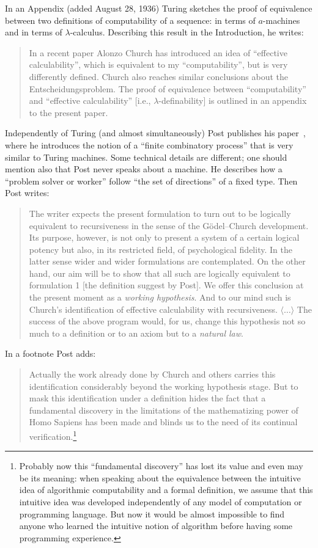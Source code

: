 \documentclass[12pt]{article}
\theoremstyle{remark}
\newcommand*{\gl}{\nobreak\hskip1pt}
\DeclareRobustCommand*{\endash}{\gl\hbox{--}\gl}
\begin{document}
In an Appendix (added August 28, 1936) Turing sketches the proof of equivalence between two definitions of computability of a sequence: in terms of $a$-machines and in terms of $\lambda$-calculus. Describing this result in the Introduction, he writes:
\begin{quote}
In a recent paper Alonzo Church has introduced an idea of ``effective calculability'', which is equivalent to my ``computability'', but is very differently defined. Church also reaches similar conclusions about the Entscheidungsproblem. The proof of equivalence between ``computability'' and ``effective calculability'' [i.e., $\lambda$-definability] is outlined in an appendix to the present paper.
\end{quote}

Independently of Turing (and almost simultaneously) Post publishes his paper~\cite{Post1936}, where he introduces the notion of a ``finite combinatory process'' that is very similar to Turing machines. Some technical details are different; one should mention also that Post never speaks about a machine. He describes how a ``problem solver or worker'' follow ``the set of directions'' of a fixed type. Then Post writes: 
%
\begin{quote}
The writer expects the present formulation to turn out to be logically equivalent to recursiveness in the sense of the G\"{o}del\endash Church development. Its purpose, however, is not only to present a system of a certain logical potency but also, in its restricted field, of psychological fidelity. In the latter sense wider and wider formulations are contemplated. On the other hand, our aim will be to show that all such are logically equivalent to formulation 1 [the definition suggest by Post]. We offer this conclusion at the present moment as a \emph{working hypothesis}. And to our mind such is Church's identification of effective calculability with recursiveness. $\langle\ldots\rangle$ The success of the above program would, for us, change this hypothesis not so much to a definition or to an axiom but to a \emph{natural law}. 
\end{quote}
In a footnote Post adds:
\begin{quote}
Actually the work already done by Church and others carries this identification considerably beyond the working hypothesis stage. But to mask this identification under a definition hides the fact that a fundamental discovery in the limitations of the mathematizing power of Homo Sapiens has been made and blinds us to the need of its continual verification.\footnote{%
Probably now this ``fundamental discovery'' has lost its value and even may be its meaning: when speaking about the equivalence between the intuitive idea of algorithmic computability and a formal definition, we assume that this intuitive idea was developed independently of any model of computation or programming language. But now it would be almost impossible to find anyone who learned the intuitive notion of algorithm before having some programming experience.}
\end{quote}
\end{document}
